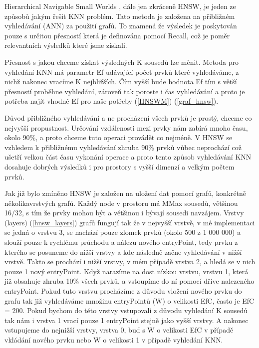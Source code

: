 \documentclass[czech,semestral,dept460,male,csharp,cpdeclaration]{diploma}
\begin{document}
		Hierarchical Navigable Small Worlds \cite{malkov2018efficient}, dále jen zkráceně HNSW, je jeden ze způsobů jakým řešit KNN problém. Tato metoda je založena na přibližném vyhledávání (ANN) za použití grafů. To znamená že výsledek je poskytován pouze s určitou přesností která je definována pomocí Recall, což je poměr relevantních výsledků které jsme získali.
		
		Přesnost s jakou chceme získat výsledných K sousedů lze měnit. Metoda pro vyhledání KNN má parametr Ef udávající počet prvků které vyhledáváme, z nichž nakonec vracíme K nejbližších. Čím vyšší bude hodnota Ef tím s větší přesností proběhne vyhledání, zároveň tak poroste i čas vyhledávání a proto je potřeba najít vhodné Ef pro naše potřeby (\ref{HNSWM}) (\ref{graf_hnsw}).
		
		Důvod přibližného vyhledávání a ne procházení všech prvků je prostý, chceme co nejvyšší propustnost. Určování vzdálenosti mezi prvky nám zabírá mnoho času, okolo 90\%, a proto chceme tuto operaci provádět co nejméně. V HNSW se vzhledem k přibližnému vyhledávání zhruba 90\% prvků vůbec neprochází což ušetří velkou část času vykonání operace a proto tento způsob vyhledávání KNN dosahuje dobrých výsledků i pro prostory s vyšší dimenzí a velkým počtem prvků.
		
		Jak již bylo zmíněno HNSW je založen na uložení dat pomocí grafů, konkrétně několikavrstvých grafů. Každý node v prostoru má MMax sousedů, většinou 16/32, s tím že prvky mohou být a většinou i bývají sousedi navzájem. Vrstvy (layers) (\ref{hnsw_layers}) grafů fungují tak že v nejvyšší vrstvě, v mé implementaci se jedná o vrstvu 3, se nachází pouze zlomek prvků (okolo 500 z 1 000 000) a slouží pouze k rychlému průchodu a nálezu nového entryPoint, tedy prvku z kterého se posuneme do nižší vrstvy a kde následně začne vyhledávání v nižší vrstvě. Takto se prochází i nižší vrstvy, v mém případě vrstva 2, a hledá se v nich pouze 1 nový entryPoint. Když narazíme na dost nízkou vrstvu, vrstvu 1, která již obsahuje zhruba 10\% všech prvků, a vstoupíme do ní pomocí dříve nalezeného entryPoint. Pokud tuto vrstvu procházíme z důvodu vložení nového prvku do grafu tak již vyhledáváme množinu entryPointů (W) o velikosti EfC, často je EfC = 200. Pokud bychom do této vrstvy vstupovali z důvodu vyhledání K sousedů tak nám i vrstva 1 vrací pouze 1 entryPoint stejně jako vyšší vrstvy. A nakonec vstupujeme do nejnižší vrstvy, vrstva 0, buď s W o velikosti EfC v případě vkládání nového prvku nebo W o velikosti 1 v případě vyhledání KNN.
		
\end{document}

